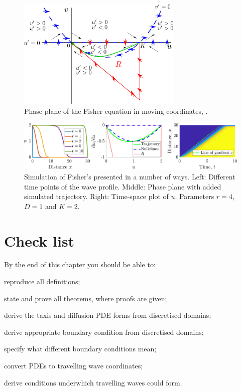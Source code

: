 \begin{figure}[!!!h!!!tb]
\centering
\includegraphics[width=0.7\textwidth]{../Pictures/Fisher_phase_plane.png}
\caption{\label{Fisher_phase_plane} Phase plane of the Fisher equation in moving coordinates, .}
\end{figure}
\begin{figure}[!!!h!!!tb]
\centering
\includegraphics[width=\tp]{../Pictures/Fisher_sims.png}
\caption{\label{Fisher_sims} Simulation of Fisher's  presented in a number of ways. Left: Different time points of the wave profile. Middle: Phase plane with added simulated trajectory. Right: Time-space plot of $u$. Parameters $r=4$, $D=1$ and $K=2$.}
\end{figure}
\section{Check list}
By the end of this chapter you should be able to:
\begin{todolist}
\item reproduce all definitions;
\item state and prove all theorems, where proofs are given;
\item derive the taxis and diffusion PDE forms from discretised domains;
\item derive appropriate boundary condition from discretised domains;
\item specify what different boundary conditions mean;
\item convert PDEs to travelling wave coordinates;
\item derive conditions underwhich travelling waves could form.
\end{todolist}
